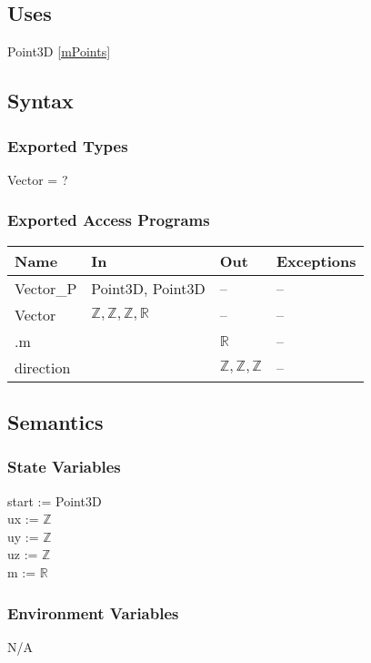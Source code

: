 \documentclass[12pt, titlepage]{article}
\begin{document}
\subsection{Uses}
Point3D \ref{mPoints}

\subsection{Syntax}
\subsubsection{Exported Types}
Vector = ?
\subsubsection{Exported Access Programs}
\begin{center}
	\begin{tabular}{p{4cm} p{2cm} p{2cm} p{4cm}}
		\hline
		\textbf{Name} & \textbf{In} & \textbf{Out} & \textbf{Exceptions} \\
		\hline
		Vector\_P & Point3D, Point3D & -- & -- \\
		Vector & $ \mathbb{Z},\mathbb{Z},\mathbb{Z},\mathbb{R} $ & -- & -- \\
		.m & & $\mathbb{R}$ & -- \\
		direction & & $ \mathbb{Z},\mathbb{Z},\mathbb{Z}$  & -- 
		\\	
		\hline
	\end{tabular}
\end{center}

\subsection{Semantics}
\subsubsection{State Variables}
start := Point3D \\
ux := $\mathbb{Z}$ \\
uy := $\mathbb{Z}$ \\
uz := $\mathbb{Z}$ \\
m := $\mathbb{R}$ \\ 

\subsubsection{Environment Variables}
N/A
\end{document}
